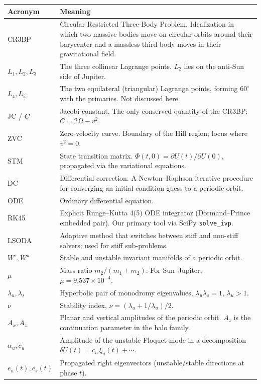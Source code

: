 \documentclass[11pt,a4paper]{article}
\begin{document}
\begin{longtable}{@{}l p{}@{}}
\toprule
\textbf{Acronym} & \textbf{Meaning} \\
\midrule
\endhead
CR3BP  & Circular Restricted Three-Body Problem. Idealization in which two massive bodies move on circular orbits around their barycenter and a massless third body moves in their gravitational field. \\
$L_1, L_2, L_3$ & The three collinear Lagrange points. $L_2$ lies on the anti-Sun side of Jupiter. \\
$L_4, L_5$ & The two equilateral (triangular) Lagrange points, forming $60^\circ$ with the primaries. Not discussed here. \\
JC / $C$ & Jacobi constant. The only conserved quantity of the CR3BP; $C = 2\Omega - v^2$. \\
ZVC & Zero-velocity curve. Boundary of the Hill region; locus where $v^2 = 0$. \\
STM & State transition matrix. $\Phi(t,0) = \partial U(t) / \partial U(0)$, propagated via the variational equations. \\
DC & Differential correction. A Newton--Raphson iterative procedure for converging an initial-condition guess to a periodic orbit. \\
ODE & Ordinary differential equation. \\
RK45 & Explicit Runge--Kutta 4(5) ODE integrator (Dormand--Prince embedded pair). Our primary tool via SciPy \texttt{solve\_ivp}. \\
LSODA & Adaptive method that switches between stiff and non-stiff solvers; used for stiff sub-problems. \\
$W^s, W^u$ & Stable and unstable invariant manifolds of a periodic orbit. \\
$\mu$ & Mass ratio $m_2/(m_1+m_2)$. For Sun--Jupiter, $\mu = 9.537\times 10^{-4}$. \\
$\lambda_u, \lambda_s$ & Hyperbolic pair of monodromy eigenvalues, $\lambda_u \lambda_s = 1$, $\lambda_u > 1$. \\
$\nu$ & Stability index, $\nu = (\lambda_u + 1/\lambda_u)/2$. \\
$A_x, A_z$ & Planar and vertical amplitudes of the periodic orbit. $A_z$ is the continuation parameter in the halo family. \\
$\alpha_u, c_u$ & Amplitude of the unstable Floquet mode in a decomposition $\delta U(t) = c_u\,\xi_u(t) + \cdots$. \\
$e_u(t), e_s(t)$ & Propagated right eigenvectors (unstable/stable directions at phase $t$). \\

\end{longtable}
\end{document}
